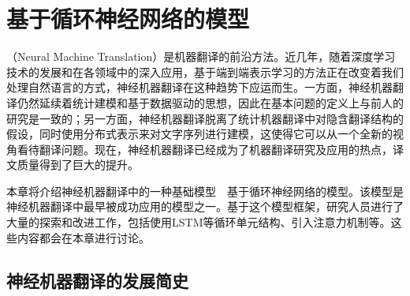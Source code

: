
%


\renewcommand\figurename{图}%
\renewcommand\tablename{表}%


\chapter{基于循环神经网络的模型}

 （Neural Machine Translation）是机器翻译的前沿方法。近几年，随着深度学习技术的发展和在各领域中的深入应用，基于端到端表示学习的方法正在改变着我们处理自然语言的方式，神经机器翻译在这种趋势下应运而生。一方面，神经机器翻译仍然延续着统计建模和基于数据驱动的思想，因此在基本问题的定义上与前人的研究是一致的；另一方面，神经机器翻译脱离了统计机器翻译中对隐含翻译结构的假设，同时使用分布式表示来对文字序列进行建模，这使得它可以从一个全新的视角看待翻译问题。现在，神经机器翻译已经成为了机器翻译研究及应用的热点，译文质量得到了巨大的提升。

\parinterval 本章将介绍神经机器翻译中的一种基础模型\ \dash \ 基于循环神经网络的模型。该模型是神经机器翻译中最早被成功应用的模型之一。基于这个模型框架，研究人员进行了大量的探索和改进工作，包括使用LSTM等循环单元结构、引入注意力机制等。这些内容都会在本章进行讨论。

\sectionnewpage
\section{神经机器翻译的发展简史}

